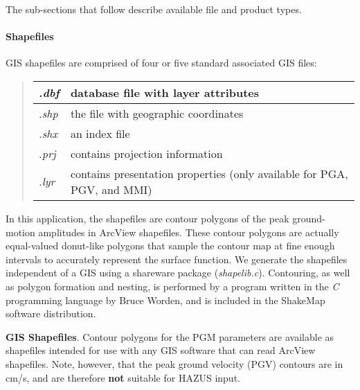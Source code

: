 \documentclass[letterpaper,10pt,english]{sphinxmanual}
\begin{document}
The sub-sections that follow describe available file and product types.


\paragraph{Shapefiles}
\label{products:shapefiles}
GIS shapefiles are comprised of four or five standard associated GIS files:
\begin{quote}

\begin{tabulary}{\linewidth}{|L|L|}
\hline

\emph{.dbf}
 & 
database file with layer attributes
\\
\hline
\emph{.shp}
 & 
the file with geographic coordinates
\\
\hline
\emph{.shx}
 & 
an index file
\\
\hline
\emph{.prj}
 & 
contains projection information
\\
\hline
\emph{.lyr}
 & 
contains presentation properties (only available for PGA, PGV, and MMI)
\\
\hline\end{tabulary}

\end{quote}

In this application, the shapefiles are contour polygons of the peak
ground-motion amplitudes in ArcView shapefiles. These contour polygons are
actually equal-valued donut-like polygons that sample the contour map at fine
enough intervals to accurately represent the surface function. We generate the
shapefiles independent of a GIS using a shareware package (\emph{shapelib.c}).
Contouring, as well as polygon formation and nesting, is performed by a program
written in the \emph{C} programming language by Bruce Worden, and is included in the ShakeMap
software distribution.

\textbf{GIS Shapefiles}. Contour polygons for the PGM parameters are
available as shapefiles intended for use with any GIS software that can
read ArcView shapefiles.  Note, however, that the peak ground velocity (PGV)
contours are in cm/s, and are therefore \textbf{not} suitable for HAZUS input.
\end{document}
